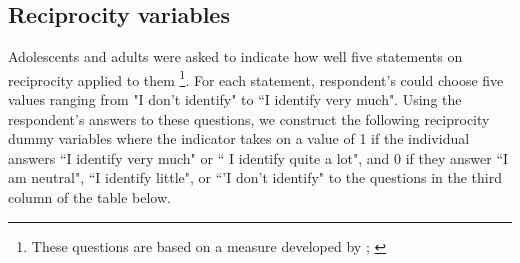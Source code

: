 \subsection{Reciprocity variables}
Adolescents and adults were asked to indicate how well five statements on reciprocity applied to them \footnote{These questions are based on a measure developed by \cite{Perugini2003}; \cite{Dohmen2009}}. For each statement, respondent's could choose five values ranging from  "I don't identify" to ``I identify very much". Using the respondent's answers to these questions, we construct the following reciprocity dummy variables where the indicator takes on a value of 1 if the individual answers ``I identify very much" or `` I identify quite a lot", and 0 if they answer ``I am neutral", ``I identify little", or ``'I don't identify" to the questions in the third column of the table below.
\begin{table}[H]
\begin{center}
\end{center}
\end{table}

